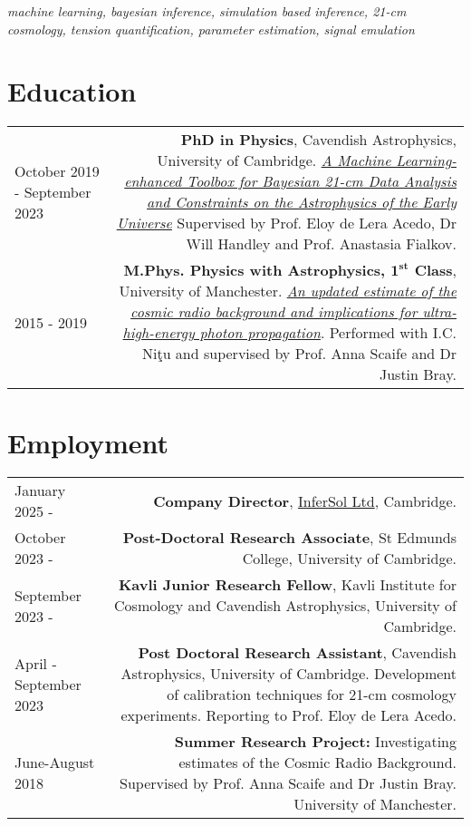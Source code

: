 \documentclass{article}
\begin{document}
\noindent \textit{machine learning, bayesian inference, simulation based inference, 21-cm cosmology, tension quantification, parameter estimation, signal emulation}

\section*{Education}
\begin{tabular}{L!{\vrule}R}
	October 2019 - September 2023 & \textbf{PhD in Physics}, Cavendish Astrophysics, University of Cambridge. \href{https://github.com/htjb/Thesis}{\textit{A Machine Learning-enhanced Toolbox for Bayesian 21-cm Data Analysis and Constraints on the Astrophysics of the Early Universe}} Supervised by Prof. Eloy de Lera Acedo, Dr Will Handley and Prof. Anastasia Fialkov. \\
	2015 - 2019 & \textbf{M.Phys. Physics with Astrophysics, $\mathbf{1^{st}}$ Class}, University of Manchester. \href{https://www.sciencedirect.com/science/article/pii/S0927650520301043?via\%3Dihub}{\textit{An updated estimate of the cosmic radio background and implications for ultra-high-energy photon propagation}}. Performed with I.C. Ni\c{t}u and supervised by Prof. Anna Scaife and Dr Justin Bray. \\
\end{tabular}

\section*{Employment}
\begin{tabular}{L!{\vrule}R}
    January 2025 - & \textbf{Company Director}, \href{https://infersolltd.github.io}{InferSol Ltd}, Cambridge. \\
    October 2023 - & \textbf{Post-Doctoral Research Associate}, St Edmunds College, University of Cambridge. \\
    September 2023 - & \textbf{Kavli Junior Research Fellow}, Kavli Institute for Cosmology and Cavendish Astrophysics, University of Cambridge. \\
    April - September 2023 & \textbf{Post Doctoral Research Assistant}, Cavendish Astrophysics, University of Cambridge. Development of calibration techniques for 21-cm cosmology experiments. Reporting to Prof. Eloy de Lera Acedo.\\
    June-August 2018 & \textbf{Summer Research Project:} Investigating estimates of the Cosmic Radio Background. Supervised by Prof. Anna Scaife and Dr Justin Bray. University of Manchester. \\
\end{tabular}
\end{document}
